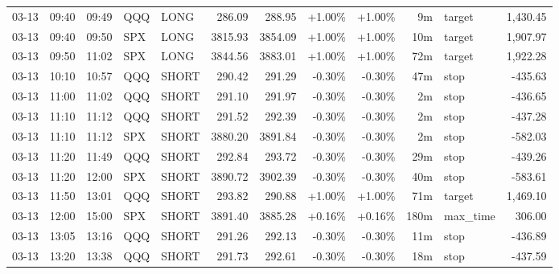 \documentclass[11pt,a4paper,twoside]{article}
\begin{document}
\begin{center}
\begin{longtable}{>{\color{txtmain}}l l l l l r r r r r >{\color{txtmain}}l r}
03-13 & 09:40 & 09:49 & QQQ & LONG & 286.09 & 288.95 & \textcolor{wingreen}{+1.00\%} & \textcolor{wingreen}{+1.00\%} & 9m & target & \textcolor{wingreen}{1,430.45} \\
03-13 & 09:40 & 09:50 & SPX & LONG & 3815.93 & 3854.09 & \textcolor{wingreen}{+1.00\%} & \textcolor{wingreen}{+1.00\%} & 10m & target & \textcolor{wingreen}{1,907.97} \\
03-13 & 09:50 & 11:02 & SPX & LONG & 3844.56 & 3883.01 & \textcolor{wingreen}{+1.00\%} & \textcolor{wingreen}{+1.00\%} & 72m & target & \textcolor{wingreen}{1,922.28} \\
03-13 & 10:10 & 10:57 & QQQ & SHORT & 290.42 & 291.29 & \textcolor{lossred}{-0.30\%} & \textcolor{lossred}{-0.30\%} & 47m & stop & \textcolor{lossred}{-435.63} \\
03-13 & 11:00 & 11:02 & QQQ & SHORT & 291.10 & 291.97 & \textcolor{lossred}{-0.30\%} & \textcolor{lossred}{-0.30\%} & 2m & stop & \textcolor{lossred}{-436.65} \\
03-13 & 11:10 & 11:12 & QQQ & SHORT & 291.52 & 292.39 & \textcolor{lossred}{-0.30\%} & \textcolor{lossred}{-0.30\%} & 2m & stop & \textcolor{lossred}{-437.28} \\
03-13 & 11:10 & 11:12 & SPX & SHORT & 3880.20 & 3891.84 & \textcolor{lossred}{-0.30\%} & \textcolor{lossred}{-0.30\%} & 2m & stop & \textcolor{lossred}{-582.03} \\
03-13 & 11:20 & 11:49 & QQQ & SHORT & 292.84 & 293.72 & \textcolor{lossred}{-0.30\%} & \textcolor{lossred}{-0.30\%} & 29m & stop & \textcolor{lossred}{-439.26} \\
03-13 & 11:20 & 12:00 & SPX & SHORT & 3890.72 & 3902.39 & \textcolor{lossred}{-0.30\%} & \textcolor{lossred}{-0.30\%} & 40m & stop & \textcolor{lossred}{-583.61} \\
03-13 & 11:50 & 13:01 & QQQ & SHORT & 293.82 & 290.88 & \textcolor{wingreen}{+1.00\%} & \textcolor{wingreen}{+1.00\%} & 71m & target & \textcolor{wingreen}{1,469.10} \\
03-13 & 12:00 & 15:00 & SPX & SHORT & 3891.40 & 3885.28 & \textcolor{wingreen}{+0.16\%} & \textcolor{wingreen}{+0.16\%} & 180m & max\_time & \textcolor{wingreen}{306.00} \\
03-13 & 13:05 & 13:16 & QQQ & SHORT & 291.26 & 292.13 & \textcolor{lossred}{-0.30\%} & \textcolor{lossred}{-0.30\%} & 11m & stop & \textcolor{lossred}{-436.89} \\
03-13 & 13:20 & 13:38 & QQQ & SHORT & 291.73 & 292.61 & \textcolor{lossred}{-0.30\%} & \textcolor{lossred}{-0.30\%} & 18m & stop & \textcolor{lossred}{-437.59} \\

\end{longtable}
\end{center}
\end{document}
